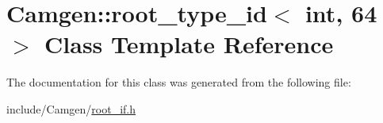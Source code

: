 \hypertarget{a00489}{}\section{Camgen\+:\+:root\+\_\+type\+\_\+id$<$ int, 64 $>$ Class Template Reference}
\label{a00489}


The documentation for this class was generated from the following file\+:\begin{DoxyCompactItemize}
\item 
include/\+Camgen/\hyperlink{a00760}{root\+\_\+if.\+h}\end{DoxyCompactItemize}
